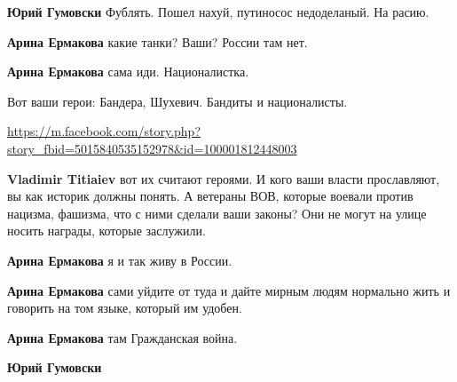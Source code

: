 \begin{itemize}
\begin{itemize}

\textbf{Юрий Гумовски} Фублять. Пошел нахуй, путиносос недоделаный. На расию.


\textbf{Арина Ермакова} какие танки? Ваши? России там нет.


\textbf{Арина Ермакова} сама иди. Националистка. 

Вот ваши герои: Бандера, Шухевич. Бандиты и националисты. 

\url{https://m.facebook.com/story.php?story_fbid=5015840535152978&id=100001812448003}


\textbf{Vladimir Titiaiev} вот их считают героями. И кого ваши власти прославляют, вы как историк должны понять. А ветераны ВОВ, которые воевали против нацизма, фашизма, что с ними сделали ваши законы? Они не могут на улице носить награды, которые заслужили.


\textbf{Арина Ермакова} я и так живу в России.


\textbf{Арина Ермакова} сами уйдите от туда и дайте мирным людям нормально жить и говорить на том языке, который им удобен.


\textbf{Арина Ермакова} там Гражданская война.


\textbf{Юрий Гумовски} 


\end{itemize}
\end{itemize}
